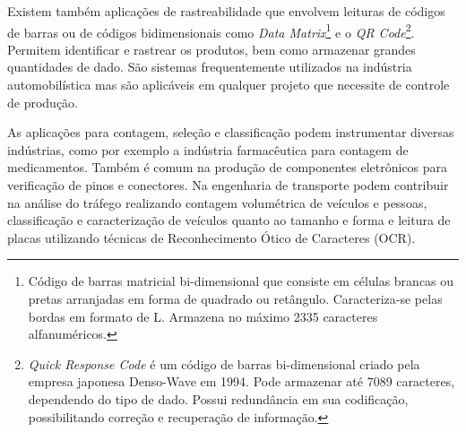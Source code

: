 Existem também aplicações de rastreabilidade que envolvem leituras de códigos de barras ou de códigos bidimensionais como \textit{Data Matrix}\footnote{Código de barras matricial bi-dimensional que consiste em células brancas ou pretas arranjadas em forma de quadrado ou retângulo. Caracteriza-se pelas bordas em formato de L. Armazena no máximo 2335 caracteres alfanuméricos.} e o \textit{QR Code}\footnote{\textit{Quick Response Code} é um código de barras bi-dimensional criado pela empresa japonesa Denso-Wave em 1994. Pode armazenar até 7089 caracteres, dependendo do tipo de dado. Possui redundância em sua codificação, possibilitando correção e recuperação de informação.}. Permitem identificar e rastrear os produtos, bem como armazenar grandes quantidades de dado. São sistemas frequentemente utilizados na indústria automobilística mas são aplicáveis em qualquer projeto que necessite de controle de produção.

As aplicações para contagem, seleção e classificação podem instrumentar diversas indústrias, como por exemplo a indústria farmacêutica para contagem de medicamentos. Também é comum na produção de componentes eletrônicos para verificação de pinos e conectores. Na engenharia de transporte podem contribuir na análise do tráfego realizando contagem volumétrica de veículos e pessoas, classificação e caracterização de veículos quanto ao tamanho e forma e leitura de placas utilizando técnicas de Reconhecimento Ótico de Caracteres (OCR).